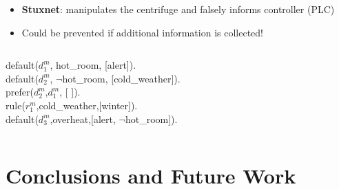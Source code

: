 \documentclass[unknownkeysallowed]{beamer}
\begin{document}
\begin{frame}{}

\begin{itemize} 
\item \textbf{Stuxnet}: manipulates the centrifuge and 
falsely informs controller (PLC) 
\item Could be prevented if additional information is 
collected!   
\end{itemize} 

\begin{columns}

\column{3in} 


default($d_1^m$, hot\_room, [\alert{alert}]). \\
default($d_2^m$, $\neg$hot\_room, [cold\_weather]). \\
prefer($d_2^m$,$d_1^m$, [ ]). \\
rule($r_1^m$,cold\_weather,[\alert{winter}]). \\
default($d_3^m$,overheat,[\alert{alert}, $\neg$hot\_room]).

\column{1.4in}
\end{columns} 


 
\end{frame}




\section{Conclusions and Future Work} 
\end{document}
